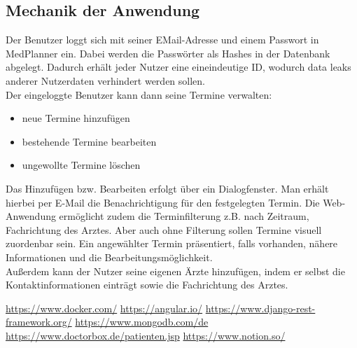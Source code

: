 \documentclass[conference]{IEEEtran}
\begin{document}
\subsection{Mechanik der Anwendung}
Der Benutzer loggt sich mit seiner EMail-Adresse und einem Passwort in MedPlanner ein. Dabei werden die Passwörter als Hashes in der Datenbank abgelegt. Dadurch erhält jeder Nutzer eine eineindeutige ID, wodurch data leaks anderer Nutzerdaten verhindert werden sollen.\\
Der eingeloggte Benutzer kann dann seine Termine verwalten: 
\begin{itemize}
	\item neue Termine hinzufügen
	\item bestehende Termine bearbeiten
	\item ungewollte Termine löschen
\end{itemize}

Das Hinzufügen bzw. Bearbeiten erfolgt über ein Dialogfenster.
Man erhält hierbei per E-Mail die Benachrichtigung für den festgelegten Termin.
Die Web-Anwendung ermöglicht zudem die Terminfilterung z.B. nach Zeitraum, Fachrichtung des Arztes. Aber auch ohne Filterung sollen Termine visuell zuordenbar sein. Ein angewählter Termin präsentiert, falls vorhanden, nähere Informationen und die Bearbeitungsmöglichkeit.\\
Außerdem kann der Nutzer seine eigenen Ärzte hinzufügen, indem er selbst die Kontaktinformationen einträgt sowie die Fachrichtung des Arztes.


\begin{thebibliography}{00}
 \url{https://www.docker.com/}
 \url{https://angular.io/}
 \url{https://www.django-rest-framework.org/}
 \url{https://www.mongodb.com/de}
 \url{https://www.doctorbox.de/patienten.jsp}
 \url{https://www.notion.so/}
\end{thebibliography}
\end{document}
